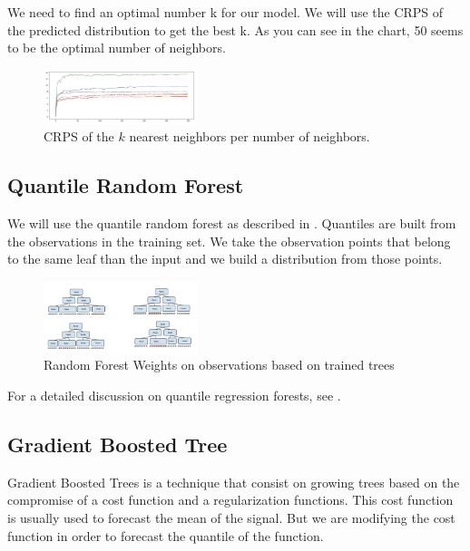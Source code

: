 \documentclass[a4paper,twocolumn,5p]{elsarticle}
\begin{document}
We need to find an optimal number k for our model. We will use the CRPS of the predicted distribution
to get the best k. As you can see in the chart, 50 seems to be the optimal 
number of neighbors.

\begin{figure}
  \caption{CRPS of the $k$ nearest neighbors per number of neighbors.}
  \centering
  \includegraphics[width=0.4\textwidth]{kneighbor_crps}
\end{figure}

\subsection{Quantile Random Forest}

We will use the quantile random forest as described in \cite{randomforestdesc}. Quantiles are built 
from the observations in the training set. We take the observation points that belong to the 
same leaf than the input and we build a distribution from those points. 

\begin{figure}
  \centering
  \includegraphics[width=0.4\textwidth]{quantile_random_forest}
  \caption{Random Forest Weights on observations based on trained trees}
\end{figure}


For a detailed discussion on quantile regression forests, see
\cite{meinshausen_quantile_2006}.

\subsection{Gradient Boosted Tree}

Gradient Boosted Trees is a technique that consist on growing trees based on the compromise 
of a cost function and a regularization functions. This cost function is usually used to forecast 
the mean of the signal. But we are modifying the cost function 
in order to forecast the quantile of the function. 
\end{document}
